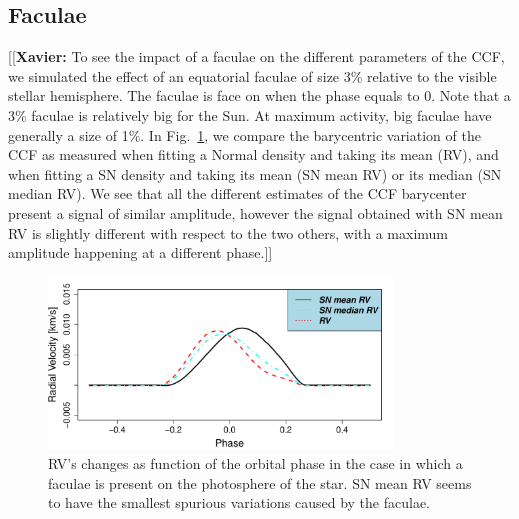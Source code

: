 \documentclass{aa}
\newcommand{\xavier}[1]{{\color{blue}[[\textbf{Xavier: }#1]]}}
\begin{document}
\subsection{Faculae} \label{sec:soap.faculae}

\xavier{To see the impact of a faculae on the different parameters of the CCF, we simulated the effect of an equatorial faculae of size 3\% relative to the visible stellar hemisphere. The faculae is face on when the phase equals to 0. Note that a 3\% faculae is relatively big for the Sun. At maximum activity, big faculae have generally a size of 1\%.
In Fig.~\ref{fig:faculae}, we compare the barycentric variation of the CCF as measured when fitting a Normal density and taking its mean (RV), and when fitting a SN density and taking its mean (SN mean RV) or its median (SN median RV). We see that all the different estimates of the CCF barycenter present a signal of similar amplitude, however the signal obtained with SN mean RV is slightly different with respect to the two others, with a maximum amplitude happening at a different phase.}

\begin{figure}[htbp]
   \centering
\includegraphics[width=3.6in]{RV_comparison_FACULAE.pdf} 
\caption{RV's changes as function of the orbital phase in the case in which a faculae is present on the photosphere of the star. SN mean RV seems to have the smallest spurious variations caused by the faculae.}
    \label{fig:faculae}
\end{figure}
\end{document}
